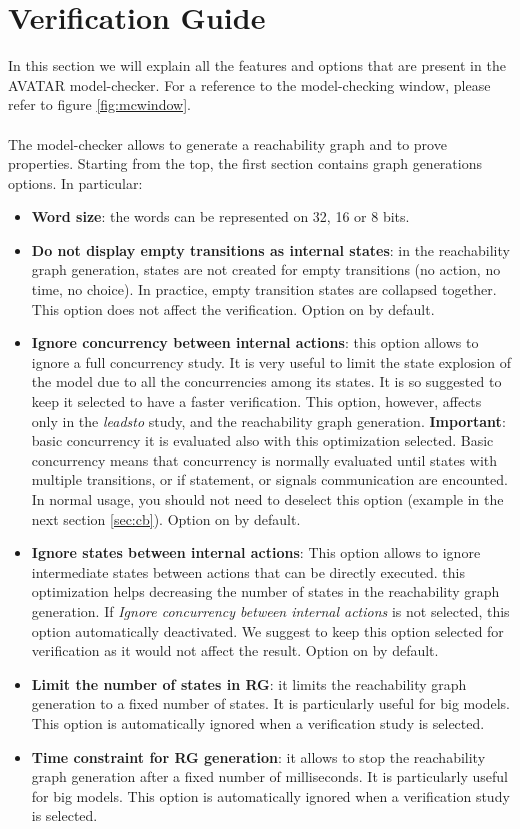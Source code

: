 \documentclass[12pt]{article}
\begin{document}
\newpage
\section{Verification Guide} \label{sec:vg}
In this section we will explain all the features and options that are present in the AVATAR model-checker. For a reference to the model-checking window, please refer to figure \ref{fig:mcwindow}.
\\\\The model-checker allows to generate a reachability graph and to prove properties. Starting from the top, the first section contains graph generations options. In particular:
\begin{itemize}
	\item \textbf{Word size}: the words can be represented on 32, 16 or 8 bits.
	\item \textbf{Do not display empty transitions as internal states}: in the reachability graph generation, states are not created for empty transitions (no action, no time, no choice). In practice, empty transition states are collapsed together. This option does not affect the verification. Option on by default.
	\item \textbf{Ignore concurrency between internal actions}: this option allows to ignore a full concurrency study. It is very useful to limit the state explosion of the model due to all the concurrencies among its states. It is so suggested to keep it selected to have a faster verification. This option, however, affects only in the \textit{leadsto} study, and the reachability graph generation. \textbf{Important}: basic concurrency it is evaluated also with this optimization selected. Basic concurrency means that concurrency is normally evaluated until states with multiple transitions, or if statement, or signals communication are encounted. In normal usage, you should not need to deselect this option (example in the next section \ref{sec:cb}). Option on by default.
	\item \textbf{Ignore states between internal actions}: This option allows to ignore intermediate states between actions that can be directly executed. this optimization helps decreasing the number of states in the reachability graph generation. If  \textit{Ignore concurrency between internal actions} is not selected, this option automatically deactivated. We suggest to keep this option selected for verification as it would not affect the result. Option on by default.
	 \item \textbf{Limit the number of states in RG}: it limits the reachability graph generation to a fixed number of states. It is particularly useful for big models. This option is automatically ignored when a verification study is selected.
	 \item \textbf{Time constraint for RG generation}: it allows to stop the reachability graph generation after a fixed number of milliseconds. It is particularly useful for big models. This option is automatically ignored when a verification study is selected.
\end{itemize}
\end{document}

